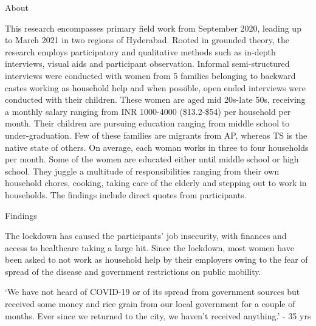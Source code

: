 \documentclass[final]{beamer}
\newlength{\colwidth}
\begin{document}
\begin{frame}[t]
\begin{columns}[t]
\begin{column}{\colwidth}
\vspace{-0.5cm}
  \begin{block}{About}

This research encompasses primary field work from September 2020,
leading up to March 2021 in two regions of Hyderabad. Rooted in
grounded theory, the research employs participatory and qualitative
methods such as in-depth interviews, visual aids and participant
observation. Informal semi-structured interviews were conducted with
women from 5 families belonging to backward castes working as
household help and when possible, open ended interviews were
conducted with their children. These women are aged mid 20s-late 50s,
receiving a monthly salary ranging from INR 1000-4000 (\$13.2-\$54) per
household per month. Their children are pursuing education ranging
from middle school to under-graduation. Few of these families are
migrants from AP, whereas TS is the native state of others. On average, each woman works in three to four households per month. Some of the women are
educated either until middle school or high school. They juggle a
multitude of responsibilities ranging from their own household chores,
cooking, taking care of the elderly and stepping out to work in
households. The findings include direct quotes from participants.

  \end{block}

\vspace{-0.5cm}
  \begin{block}{Findings}

  The lockdown has caused the participants’ job insecurity, with finances
and access to healthcare taking a large hit. Since the lockdown, most
women have been asked to not work as household help by their
employers owing to the fear of spread of the disease and government
restrictions on public mobility.

\end{block}

 \begin{alertblock}{}

`We have not heard of COVID-19 or
of its spread from government
sources but received some money
and rice grain from our local
government for a couple of
months. Ever since we returned to
the city, we haven’t received
anything.' - 35 yrs

  \end{alertblock}




\end{column}
\end{columns}
\end{frame}
\end{document}
